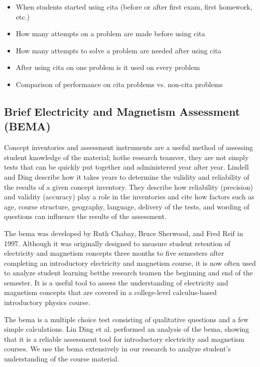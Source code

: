 \begin{itemize}
\item When students started using \gls{cita} (before or after first exam, first homework, etc.)
\item How many attempts on a problem are made before using \gls{cita}
\item How many attempts to solve a problem are needed after using \gls{cita}
\item After using \gls{cita} on one problem is it used on every problem
\item Comparison of performance on \gls{cita} problems vs. non-\gls{cita} problems
\end{itemize}

\subsection{Brief Electricity and Magnetism Assessment (BEMA)}

Concept inventories and assessment instruments are a useful method of assessing student knowledge of the material; hothe research teamver, they are not simply tests that can be quickly put together and administered year after year. Lindell and Ding describe how it takes years to determine the validity and reliability of the results of a given concept inventory. They describe how reliability (precision) and validity (accuracy) play a role in the inventories and cite how factors such as age, course structure, geography, language, delivery of the tests, and wording of questions can influence the results of the assessment\cite{lindell2012}.

The \gls{bema} was developed by Ruth Chabay, Bruce Sherwood, and Fred Reif in 1997. Although it was originally designed to measure student retention of electricity and magnetism concepts three months to five semesters after completing an introductory electricity and magnetism course, it is now often used to analyze student learning betthe research teamen the beginning and end of the semester. It is a useful tool to assess the understanding of electricity and magnetism concepts that are covered in a college-level calculus-based introductory physics course\cite{ding2006}.

The \gls{bema} is a multiple choice test consisting of qualitative questions and a few simple calculations. Lin Ding et al. performed an analysis of the \gls{bema}, showing that it is a reliable assessment tool for introductory electricity and magnetism courses\cite{ding2006}. We use the \gls{bema} extensively in our research to analyze student's understanding of the course material.

